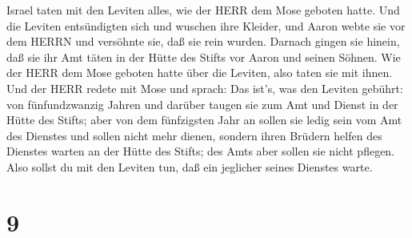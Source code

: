 Israel taten mit den Leviten alles, wie der HERR dem Mose geboten hatte.
 Und die Leviten entsündigten sich und wuschen ihre
Kleider, und Aaron webte sie vor dem HERRN und versöhnte sie, daß sie
rein wurden.  Darnach gingen sie hinein, daß sie ihr Amt
täten in der Hütte des Stifts vor Aaron und seinen Söhnen. Wie der HERR
dem Mose geboten hatte über die Leviten, also taten sie mit ihnen.
 Und der HERR redete mit Mose und sprach:  Das
ist's, was den Leviten gebührt: von fünfundzwanzig Jahren und darüber
taugen sie zum Amt und Dienst in der Hütte des Stifts; 
aber von dem fünfzigsten Jahr an sollen sie ledig sein vom Amt des
Dienstes und sollen nicht mehr dienen,  sondern ihren
Brüdern helfen des Dienstes warten an der Hütte des Stifts; des Amts
aber sollen sie nicht pflegen. Also sollst du mit den Leviten tun, daß
ein jeglicher seines Dienstes warte.

\hypertarget{section-8}{%
\section{9}\label{section-8}}

